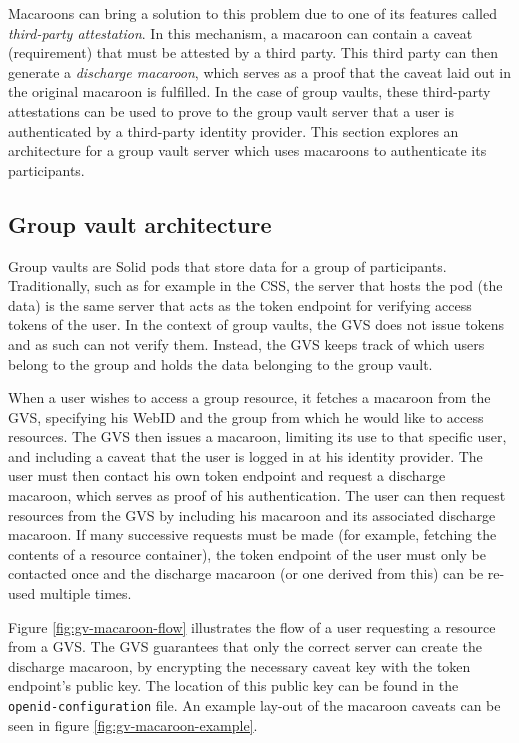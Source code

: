 Macaroons can bring a solution to this problem due to one of its features called \textit{third-party attestation}. In this mechanism, a macaroon can contain a caveat (requirement) that must be attested by a third party. This third party can then generate a \textit{discharge macaroon}, which serves as a proof that the caveat laid out in the original macaroon is fulfilled. In the case of group vaults, these third-party attestations can be used to prove to the group vault server that a user is authenticated by a third-party identity provider. This section explores an architecture for a group vault server which uses macaroons to authenticate its participants.

\subsection{Group vault architecture}
Group vaults are Solid pods that store data for a group of participants. Traditionally, such as for example in the \acrlong{CSS}, the server that hosts the pod (the data) is the same server that acts as the token endpoint for verifying access tokens of the user. In the context of group vaults, the \gls{GVS} does not issue tokens and as such can not verify them. Instead, the \gls{GVS} keeps track of which users belong to the group and holds the data belonging to the group vault.

When a user wishes to access a group resource, it fetches a macaroon from the \gls{GVS}, specifying his WebID and the group from which he would like to access resources. The \gls{GVS} then issues a macaroon, limiting its use to that specific user, and including a caveat that the user is logged in at his identity provider. The user must then contact his own token endpoint and request a discharge macaroon, which serves as proof of his authentication. The user can then request resources from the \gls{GVS} by including his macaroon and its associated discharge macaroon. If many successive requests must be made (for example, fetching the contents of a resource container), the token endpoint of the user must only be contacted once and the discharge macaroon (or one derived from this) can be re-used multiple times. 

Figure \ref{fig:gv-macaroon-flow} illustrates the flow of a user requesting a resource from a \gls{GVS}. The \gls{GVS} guarantees that only the correct server can create the discharge macaroon, by encrypting the necessary caveat key with the token endpoint's public key. The location of this public key can be found in the \texttt{openid-configuration} file. An example lay-out of the macaroon caveats can be seen in figure \ref{fig:gv-macaroon-example}.


